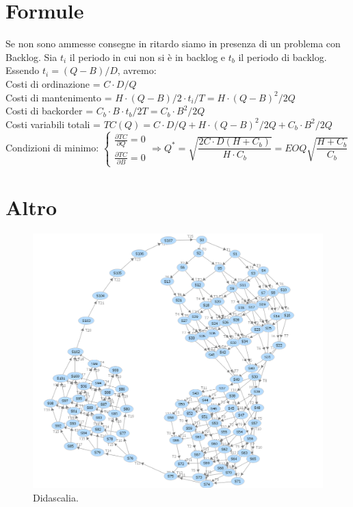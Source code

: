 \documentclass{FR16}
\begin{document}
\section{Formule}
Se non sono ammesse consegne in ritardo siamo in presenza di un problema con Backlog. Sia $ t_{i} $ il periodo in cui non si è in backlog e $ t_{b} $ il periodo di backlog. Essendo $ t_{i}=(Q-B)/D $, avremo:\\
Costi di ordinazione = $C\cdot D/Q$\\
Costi di mantenimento = $ H\cdot (Q-B)/2\cdot t_{i}/T=H\cdot (Q-B)^{2}/2Q $\\
Costi di backorder = $ C_{b}\cdot B\cdot t_{b}/2T=C_{b}\cdot B^{2}/2Q $\\
Costi variabili totali = $ TC(Q)=C\cdot D/Q+H\cdot (Q-B)^{2}/2Q+C_{b}\cdot B^{2}/2Q $\\
Condizioni di minimo: 
$\begin{cases}
\frac{\partial TC}{\partial Q}=0\\\frac{\partial TC}{\partial B}=0
\end{cases}
\Rightarrow
Q^{\ast}=\sqrt{\dfrac{2C\cdot D(H+C_{b})}{H\cdot C_{b}}}=EOQ\sqrt{\dfrac{H+C_{b}}{C_{b}}}
$

\section{Altro}
\begin{figure}[H]
\centering
\includegraphics[width=1\textwidth]{grafo.png}
\caption{\label{fig:1}Didascalia.}
\end{figure}
\end{document}
